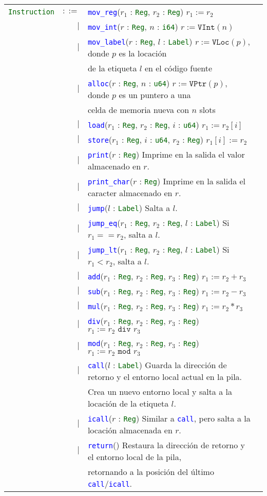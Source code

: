 \documentclass{article}
\newcommand{\ALT}{
  \\ & $\mid$ &
}
\newcommand{\type}[1]{\textcolor{darkgreen}{\texttt{#1}}}
\newcommand{\datadecl}[2]{\noindent
  \begin{tabularx}{\textwidth}{lrp{13cm}r}
  #1 & $::=$ & #2
  \end{tabularx}\\
}
\newcommand{\instruction}[1]{\texttt{\textcolor{blue}{#1}}}
\begin{document}
\datadecl{\type{Instruction}}{
  \instruction{mov\_reg}($r_1$ : \type{Reg}, $r_2$ : \type{Reg})
  \hfill {\small $r_1 := r_2$}
\ALT
  \instruction{mov\_int}($r$ : \type{Reg}, $n$ : \type{i64})
  \hfill {\small $r := \texttt{VInt}(n)$}
\ALT
  \instruction{mov\_label}($r$ : \type{Reg}, $l$ : \type{Label})
  \hfill {\small $r := \texttt{VLoc}(p)$, donde $p$ es la locación} \\
  && \hfill {\small de la etiqueta $l$ en el código fuente}
\ALT
  \instruction{alloc}($r$ : \type{Reg}, $n$ : \type{u64})
  \hfill {\small $r := \texttt{VPtr}(p)$, donde $p$ es un puntero a una} \\
  && \hfill {\small celda de memoria nueva con $n$ slots}
\ALT
  \instruction{load}($r_1$ : \type{Reg}, $r_2$ : \type{Reg}, $i$ : \type{u64})
  \hfill {\small $r_1 := r_2[i]$}
\ALT
  \instruction{store}($r_1$ : \type{Reg}, $i$ : \type{u64}, $r_2$ : \type{Reg})
  \hfill {\small $r_1[i] := r_2$}
\ALT
  \instruction{print}($r$ : \type{Reg})
  \hfill {\small Imprime en la salida el valor almacenado en $r$.}
\ALT
  \instruction{print\_char}($r$ : \type{Reg})
  \hfill {\small Imprime en la salida el caracter almacenado en $r$.}
\ALT
  \instruction{jump}($l$ : \type{Label})
  \hfill {\small Salta a $l$.}
\ALT
  \instruction{jump\_eq}($r_1$ : \type{Reg}, $r_2$ : \type{Reg}, $l$ : \type{Label})
  \hfill {\small Si $r_1 == r_2$, salta a $l$.}
\ALT
  \instruction{jump\_lt}($r_1$ : \type{Reg}, $r_2$ : \type{Reg}, $l$ : \type{Label})
  \hfill {\small Si $r_1 < r_2$, salta a $l$.}
\ALT
  \instruction{add}($r_1$ : \type{Reg}, $r_2$ : \type{Reg}, $r_3$ : \type{Reg})
  \hfill {\small $r_1 := r_2 + r_3$}
\ALT
  \instruction{sub}($r_1$ : \type{Reg}, $r_2$ : \type{Reg}, $r_3$ : \type{Reg})
  \hfill {\small $r_1 := r_2 - r_3$}
\ALT
  \instruction{mul}($r_1$ : \type{Reg}, $r_2$ : \type{Reg}, $r_3$ : \type{Reg})
  \hfill {\small $r_1 := r_2 * r_3$}
\ALT
  \instruction{div}($r_1$ : \type{Reg}, $r_2$ : \type{Reg}, $r_3$ : \type{Reg})
  \hfill {\small $r_1 := r_2 \texttt{ div } r_3$}
\ALT
  \instruction{mod}($r_1$ : \type{Reg}, $r_2$ : \type{Reg}, $r_3$ : \type{Reg})
  \hfill {\small $r_1 := r_2 \texttt{ mod } r_3$}
\ALT
  \instruction{call}($l$ : \type{Label})
  \hfill {\small Guarda la dirección de retorno y el entorno local actual en la pila.} \\
  && \hfill {\small Crea un nuevo entorno local y salta a la locación de la etiqueta $l$.}
\ALT
  \instruction{icall}($r$ : \type{Reg})
  \hfill {\small Similar a \instruction{call}, pero salta a la locación almacenada en $r$.}
\ALT
  \instruction{return}()
  \hfill {\small Restaura la dirección de retorno y el entorno local de la pila,}
  \\
  && \hfill {\small retornando a la posición del último \instruction{call}/\instruction{icall}.}
}
\end{document}
